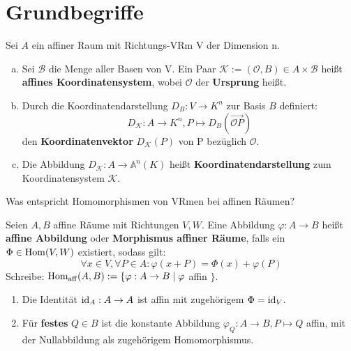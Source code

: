 \documentclass[parskip,a4paper,twoside,DIV15,BCOR12mm]{scrbook}
\begin{document}
\section{Grundbegriffe}
\begin{definition}
Sei $A$ ein affiner Raum mit Richtungs-VRm V der Dimension n.
\begin{enumerate}[(a)]
\item Sei $\mathcal{B}$ die Menge aller Basen von V. Ein Paar $\mathcal{K}:=(\mathcal{O},B)
\in A\times\mathcal{B}$ heißt \textbf{affines Koordinatensystem}, wobei $\mathcal{O}$ der
\textbf{Ursprung} heißt.
\item  Durch die Koordinatendarstellung $D_B:V\to K^n$ zur Basis $B$ definiert:
\[D_\mathcal{K}:A\to K^n,P\mapsto D_B(\overrightarrow{\mathcal{O}P})\]
den \textbf{Koordinatenvektor} $D_\mathcal{K}(P)$ von P bezüglich $\mathcal{O}$.
\item Die Abbildung $D_\mathcal{K}:A\to\mathbb{A}^n(K)$ heißt \textbf{Koordinatendarstellung}
zum Koordinatensystem $\mathcal{K}$.
\end{enumerate}
\end{definition}

\begin{task}
Was entspricht Homomorphismen von VRmen bei affinen Räumen?
\end{task}

\begin{definition}
Seien $A,B$ affine Räume mit Richtungen $V,W$.
Eine Abbildung $\varphi:A\to B$ heißt \textbf{affine Abbildung} oder \textbf{Morphismus affiner Räume},
falls ein $\Phi\in\operatorname{Hom}(V,W)$ existiert, sodass gilt:
\[\forall x\in V,\forall P\in A: \varphi(x+P)=\Phi(x)+\varphi(P)\]
Schreibe: $\operatorname{Hom_{aff}}(A,B):=\{\varphi:A\to B\mid\varphi$ affin $\}$.
\end{definition}

\begin{example}
\begin{enumerate}
\item  Die Identität $\operatorname{id}_A:A\to A$ ist affin mit zugehörigem $\Phi=\operatorname{id}_V$.
\item Für \textbf{festes} $Q\in B$ ist die konstante Abbildung $\varphi_Q:A\to B,
P\mapsto Q$ affin, mit der Nullabbildung als zugehörigem Homomorphismus.
\end{enumerate}
\end{example}
\end{document}
